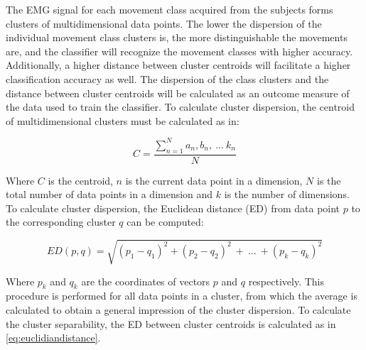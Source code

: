 The EMG signal for each movement class acquired from the subjects forms clusters of multidimensional data points. The lower the dispersion of the individual movement class clusters is, the more distinguishable the movements are, and the classifier will recognize the movement classes with higher accuracy. Additionally, a higher distance between cluster centroids will facilitate a higher classification accuracy as well. The dispersion of the class clusters and the distance between cluster centroids will be calculated as an outcome measure of the data used to train the classifier. To calculate cluster dispersion, the centroid of multidimensional clusters must be calculated as in:
\vspace{-0.5cm}

 \begin{equation} \label{eq:centroid}
C = \frac{\sum\limits_{n=1}^{N}a_{n},b_{n},~...~k_{n}}{N}
\end{equation}
\vspace{-0.5cm}

Where $C$ is the centroid, $n$ is the current data point in a dimension, $N$ is the total number of data points in a dimension and $k$ is the number of dimensions. To calculate cluster dispersion, the Euclidean distance (ED) from data point $p$ to the corresponding cluster $q$ can be computed: %
\vspace{-0.6cm}

\begin{equation} \label{eq:euclidiandistance}
ED(p,q) = \sqrt{(p_1-q_1)^2 + (p_2-q_2)^2~+~...~+ (p_k-q_k)^2}
\end{equation} 
\vspace{-0.6cm}

Where $p_k$ and $q_k$ are the coordinates of vectors $p$ and $q$ respectively. This procedure is performed for all data points in a cluster, from which the average is calculated to obtain a general impression of the cluster dispersion. To calculate the cluster separability, the ED between cluster centroids is calculated as in \eqref{eq:euclidiandistance}.  

